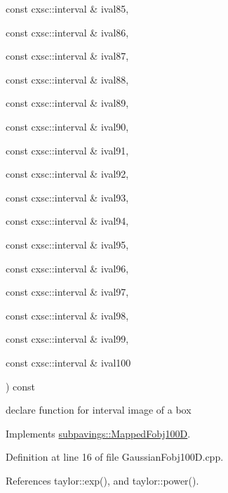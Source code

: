 {{\begin{DoxyParamCaption}
\item[{const cxsc\-::interval \&}]{ival85, }
\item[{const cxsc\-::interval \&}]{ival86, }
\item[{const cxsc\-::interval \&}]{ival87, }
\item[{const cxsc\-::interval \&}]{ival88, }
\item[{const cxsc\-::interval \&}]{ival89, }
\item[{const cxsc\-::interval \&}]{ival90, }
\item[{const cxsc\-::interval \&}]{ival91, }
\item[{const cxsc\-::interval \&}]{ival92, }
\item[{const cxsc\-::interval \&}]{ival93, }
\item[{const cxsc\-::interval \&}]{ival94, }
\item[{const cxsc\-::interval \&}]{ival95, }
\item[{const cxsc\-::interval \&}]{ival96, }
\item[{const cxsc\-::interval \&}]{ival97, }
\item[{const cxsc\-::interval \&}]{ival98, }
\item[{const cxsc\-::interval \&}]{ival99, }
\item[{const cxsc\-::interval \&}]{ival100}
\end{DoxyParamCaption}
) const}}\label{classGaussianFobj100D_a4f1b3477ee51ae239b80b3a77a89e639}


declare function for interval image of a box 



\-Implements \hyperlink{classsubpavings_1_1MappedFobj100D_a6439390e913abd6ccf9626eaa1dacd16}{subpavings\-::\-Mapped\-Fobj100\-D}.



\-Definition at line 16 of file \-Gaussian\-Fobj100\-D.\-cpp.



\-References taylor\-::exp(), and taylor\-::power().


